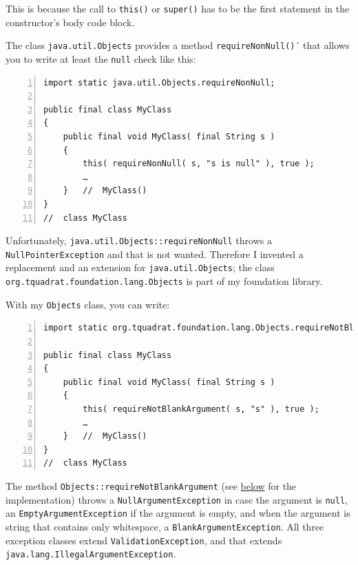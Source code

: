 \documentclass[11pt,a4paper, titlepage, parskip=half, headsepline, footsepline, cleardoublepage=current, headheight=1cm]{scrbook}
\begin{document}
This is because the call to \lstinline|this()| or \lstinline|super()| has to be the first statement in the constructor's body code block.

The class \lstinline|java.util.Objects|\autocite{ORACLE_DOC_OBJECTS_CLASS} provides a method \lstinline|requireNonNull()|\autocite{ORACLE_DOC_OBJECTS:requireNonNull}´ that allows you to write at least the \lstinline|null| check like this:
\begin{lstlisting}[numbers=left]
import static java.util.Objects.requireNonNull;

public final class MyClass
{
    public final void MyClass( final String s )
    {
        this( requireNonNull( s, "s is null" ), true );
        …
    }   //  MyClass()
}
//  class MyClass
\end{lstlisting}

Unfortunately, \lstinline|java.util.Objects::requireNonNull| throws a \lstinline|NullPointerException|\autocite{ORACLE_DOC_NULLPOINTEREXCEPTION_CLASS} and that is not wanted. Therefore I invented a replacement and an extension for \lstinline|java.util.Objects|; the class \lstinline|org.tquadrat.foundation.lang.Objects|\autocite{TQUADRAT_ORG_FOUNDATION_OBJECTS} is part of my foundation library\autocite{TQUADRAT_ORG_FOUNDATION_BASE}.

With my \lstinline|Objects| class, you can write:
\begin{lstlisting}[numbers=left]
import static org.tquadrat.foundation.lang.Objects.requireNotBlankArgument;

public final class MyClass
{
    public final void MyClass( final String s )
    {
        this( requireNotBlankArgument( s, "s" ), true );
        …
    }   //  MyClass()
}
//  class MyClass
\end{lstlisting}

The method \lstinline|Objects::requireNotBlankArgument| (see \hyperref[listing:requireNotBlankArgument]{below} for the implementation) throws a \lstinline|NullArgumentException|\autocite{TQUADRAT_ORG_FOUNDATION_NULLARGUMENTEXCEPTION} in case the argument is \lstinline|null|, an \lstinline|EmptyArgumentException|\autocite{TQUADRAT_ORG_FOUNDATION_EMPTYARGUMENTEXCEPTION} if the argument is empty, and when the argument is string that contains only whitespace, a \lstinline|BlankArgumentException|\autocite{TQUADRAT_ORG_FOUNDATION_BLANKARGUMENTEXCEPTION}. All three exception classes extend \lstinline|ValidationException|\autocite{TQUADRAT_ORG_FOUNDATION_VALIDATIONEXCEPTION}, and that extends \lstinline|java.lang.IllegalArgumentException|\autocite{ORACLE_DOC_ILLEGALARGUMENTEXCEPTION_CLASS}.
\end{document}
